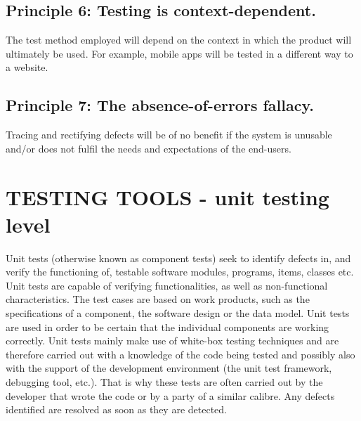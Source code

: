 \documentclass[12pt]{article}
\begin{document}
\subsection{Principle 6: Testing is context-dependent. }
The test method employed will depend on the context in which the product will ultimately be used. For example, mobile apps will be tested in a different way to a website. \newline
\subsection{Principle 7: The absence-of-errors fallacy. }
Tracing and rectifying defects will be of no benefit if the system is unusable  and/or does not fulfil the needs and expectations of the end-users. \newline

  \section{TESTING TOOLS - unit testing level}
Unit tests (otherwise known as component tests) seek to identify defects in, and verify the functioning of, testable software modules, programs, items, classes etc. \newline\newline
Unit tests are capable of verifying functionalities, as well as non-functional characteristics. The test cases are based on work products, such as the specifications of a component, the software design or the data model. Unit tests are used in order to be certain that the individual components are working correctly. \newline\newline 
Unit tests mainly make use of white-box testing techniques and are therefore carried out with a knowledge of the code being tested and possibly also with the support of the development environment (the unit test framework, debugging tool, etc.). That is why these tests are often carried out by the developer that wrote the code or by a party of a similar calibre. Any defects identified are resolved as soon as they are detected. \newline\newline
\end{document}
